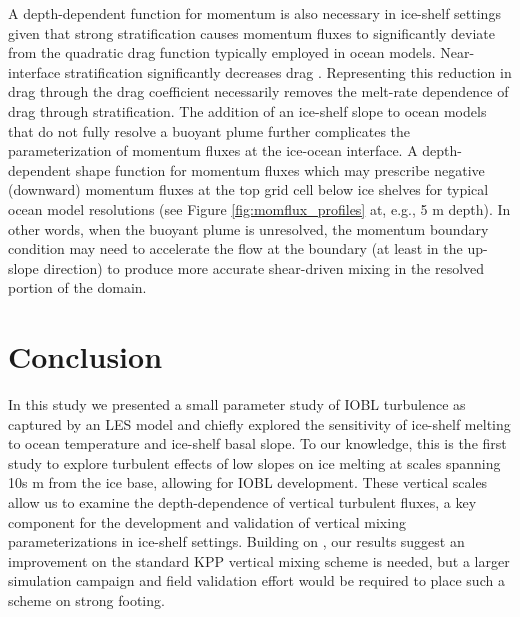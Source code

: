 \documentclass[draft]{agujournal2019}
\begin{document}
A depth-dependent function for momentum is also necessary in ice-shelf settings given that strong stratification causes momentum fluxes to significantly deviate from the quadratic drag function typically employed in ocean models. Near-interface stratification significantly decreases drag \cite{garcia-villalba_turbulence_2011, mcphee_revisiting_2008}. Representing this reduction in drag through the drag coefficient necessarily removes the melt-rate dependence of drag through stratification. The addition of an ice-shelf slope to ocean models that do not fully resolve a buoyant plume further complicates the parameterization of momentum fluxes at the ice-ocean interface. A depth-dependent shape function for momentum fluxes which may prescribe negative (downward) momentum fluxes at the top grid cell below ice shelves for typical ocean model resolutions (see Figure \ref{fig:momflux_profiles} at, e.g., 5 m depth). In other words, when the buoyant plume is unresolved, the momentum boundary condition may need to accelerate the flow at the boundary (at least in the up-slope direction) to produce more accurate shear-driven mixing in the resolved portion of the domain. 

\section{Conclusion}\label{conclusion}

In this study we presented a small parameter study of IOBL turbulence as captured by an LES model and chiefly explored the sensitivity of ice-shelf melting to ocean temperature and ice-shelf basal slope. To our knowledge, this is the first study to explore turbulent effects of low slopes on ice melting at scales spanning 10s m from the ice base, allowing for IOBL development. These vertical scales allow us to examine the depth-dependence of vertical turbulent fluxes, a key component for the development and validation of vertical mixing parameterizations in ice-shelf settings. Building on , our results suggest an improvement on the standard KPP vertical mixing scheme is needed, but a larger simulation campaign and field validation effort would be required to place such a scheme on strong footing. 
\end{document}
